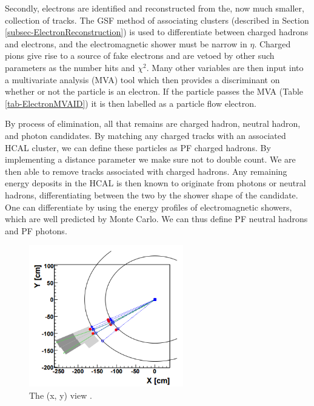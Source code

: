 Secondly, electrons are identified and reconstructed from the, now much smaller, collection of tracks. The GSF method of associating clusters (described in Section \ref{subsec-ElectronReconstruction}) is used to differentiate between charged hadrons and electrons, and the electromagnetic shower must be narrow in $\eta$. Charged pions give rise to a source of fake electrons and are vetoed by other such parameters as the number hits and $\chi^2$. Many other variables are then input into a multivariate analysis (MVA) tool which then provides a discriminant on whether or not the particle is an electron. If the particle passes the MVA (Table \ref{tab-ElectronMVAID}) it is then labelled as a particle flow electron.

By process of elimination, all that remains are charged hadron, neutral hadron, and photon candidates. By matching any charged tracks with an associated HCAL cluster, we can define these particles as PF charged hadrons. By implementing a distance parameter we make sure not to double count. We are then able to remove tracks associated with charged hadrons. Any remaining energy deposits in the HCAL is then known to originate from photons or neutral hadrons, differentiating between the two by the shower shape of the candidate. One can differentiate by using the energy profiles of electromagnetic showers, which are well predicted by Monte Carlo. We can thus define PF neutral hadrons and PF photons. 

\begin{figure}
\begin{center}
\includegraphics[width=0.6\textwidth]{Figures/PF.png}
\end{center}
\caption{The (x, y) view \cite{CMS-PAS-PFT-09-001}.}
\end{figure}

